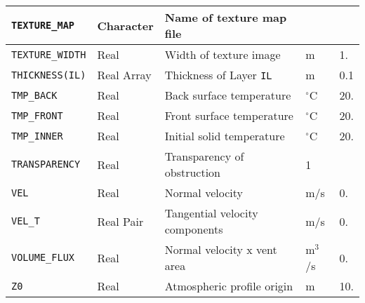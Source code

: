 \documentclass[11pt]{book}
\newcommand{\ct}{\tt\small}
\begin{document}
\begin{longtable}{|l|l|l|l|l|}
{\ct TEXTURE\_MAP}                    & Character       & Name of texture map file          &                     &        \\ \hline
{\ct TEXTURE\_WIDTH}                  & Real            & Width of texture image            & m                   & 1.     \\ \hline
{\ct THICKNESS(IL)}                   & Real Array      & Thickness of Layer {\ct IL}       & m                   & 0.1    \\ \hline
{\ct TMP\_BACK}                       & Real            & Back surface temperature          & $^\circ$C           & 20.    \\ \hline
{\ct TMP\_FRONT}                      & Real            & Front surface temperature         & $^\circ$C           & 20.    \\ \hline
{\ct TMP\_INNER}                      & Real            & Initial solid temperature         & $^\circ$C           & 20.    \\ \hline
{\ct TRANSPARENCY}                    & Real            & Transparency of obstruction       &    1                &           \\ \hline
{\ct VEL    }                         & Real            & Normal velocity                   & m/s                 & 0.     \\ \hline
{\ct VEL\_T }                         & Real Pair       & Tangential velocity components    & m/s                 & 0.     \\ \hline
{\ct VOLUME\_FLUX}                    & Real            & Normal velocity x vent area       & m$^3$/s             & 0.     \\ \hline
{\ct Z0 }                             & Real            & Atmospheric profile origin        &  m                  & 10.    \\ \hline
\end{longtable}


\end{document}
